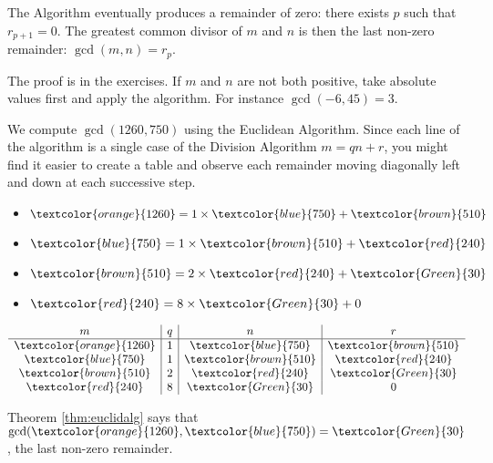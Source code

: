 \begin{thm}\label{thm:euclidalg}
The Algorithm eventually produces a remainder of zero: there exists $p$ such that $r_{p+1}=0$. The greatest common divisor of $m$ and $n$ is then the last non-zero remainder: $\gcd(m,n)=r_p$.
\end{thm}

\noindent The proof is in the exercises. If $m$ and $n$ are not both positive, take absolute values first and apply the algorithm. For instance $\gcd(-6,45)=3$.

\begin{example}
We compute $\gcd(1260,750)$ using the Euclidean Algorithm. Since each line of the algorithm is a single case of the Division Algorithm $m=qn+r$, you might find it easier to create a table and observe each remainder moving diagonally left and down at each successive step.

\noindent\begin{minipage}{0.5\textwidth}
\vspace*{10pt}
\begin{itemize}\setlength{\itemsep}{0pt}
  \item[]$\textcolor{orange}{1260}=1\times \textcolor{blue}{750}+\textcolor{brown}{510}$
  \item[]$\textcolor{blue}{750}=1\times \textcolor{brown}{510}+\textcolor{red}{240}$
  \item[]$\textcolor{brown}{510}=2\times \textcolor{red}{240}+\textcolor{Green}{30}$
  \item[]$\textcolor{red}{240}=8\times \textcolor{Green}{30}+0$
\end{itemize}
\end{minipage}
\begin{minipage}{0.5\textwidth}
\renewcommand{\arraystretch}{1.35}
$\begin{array}{c|c|c|c}
m&q&n&r\\\hline
\textcolor{orange}{1260}&1&\textcolor{blue}{750}&\textcolor{brown}{510}\\
\textcolor{blue}{750}&1&\textcolor{brown}{510}&\textcolor{red}{240}\\
\textcolor{brown}{510}&2&\textcolor{red}{240}&\textcolor{Green}{30}\\
\textcolor{red}{240}&8&\textcolor{Green}{30}&0
\end{array}$
\end{minipage}
Theorem \ref{thm:euclidalg} says that $\gcd(\textcolor{orange}{1260},\textcolor{blue}{750})=\textcolor{Green}{30}$, the last non-zero remainder.
\end{example}

